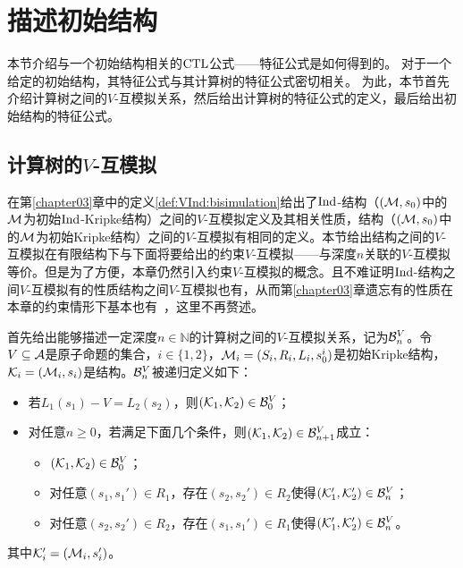 \section{描述初始结构}\label{chapter06:sec:des}%
本节介绍与一个初始结构相关的$\textrm{CTL}$公式——特征公式是如何得到的。
对于一个给定的初始结构，其特征公式与其计算树的特征公式密切相关。
为此，本节首先介绍计算树之间的$V$-互模拟关系，然后给出计算树的特征公式的定义，最后给出初始结构的特征公式。

\subsection{计算树的$V$-互模拟}
在第\ref{chapter03}章中的定义\ref{def:VInd:bisimulation}给出了$\textrm{Ind}$-结构（$({\cal M},s_0)$中的${\cal M}$为初始$\textrm{Ind}$-Kripke结构）之间的$V$-互模拟定义及其相关性质，结构（$({\cal M},s_0)$中的${\cal M}$为初始Kripke结构）之间的$V$-互模拟有相同的定义。本节给出结构之间的$V$-互模拟在有限结构下与下面将要给出的约束$V$-互模拟——与深度$n$关联的$V$-互模拟等价。但是为了方便，本章仍然引入约束$V$-互模拟的概念。且不难证明$\textrm{Ind}$-结构之间$V$-互模拟有的性质结构之间$V$-互模拟也有，从而第\ref{chapter03}章遗忘有的性质在本章的约束情形下基本也有~\cite{renyansfirstpaper}，这里不再赘述。

首先给出能够描述一定深度$n\in \mathbb{N}$的计算树之间的$V$-互模拟关系，记为${\cal B}_n^V$。令$V\subseteq {\cal A}$是原子命题的集合，$i\in \{1,2\}$，${\cal M}_i=(S_i,R_i,L_i,s_0^i)$是初始Kripke结构，${\cal K}_i=({\cal M}_i, s_i)$是结构。${\cal B}_n^V$被递归定义如下：
\begin{itemize}
	\item 若$L_1(s_1)-V=L_2(s_2)$，则$({\cal K}_1,{\cal K}_2) \in {\cal B}_0^V$；
	\item 对任意$n\ge 0$，若满足下面几个条件，则$({\cal K}_1,{\cal K}_2)\in {\cal B}_{n+1}^V$成立：
	\begin{itemize}
		\item $({\cal K}_1,{\cal K}_2) \in {\cal B}_0^V$；
		\item 对任意$(s_1,s_1')\in R_1$，存在$(s_2,s_2')\in R_2$使得$({\cal K}_1',{\cal K}_2') \in {\cal B}_n^V$；
		\item 对任意$(s_2,s_2')\in R_2$，存在$(s_1,s_1')\in R_1$使得$({\cal K}_1',{\cal K}_2') \in {\cal B}_n^V$。
	\end{itemize}
\end{itemize}
其中${\cal K}_i'=({\cal M}_i,s_i')$。


